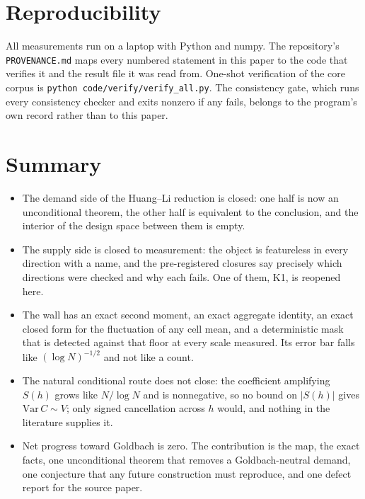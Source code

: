 \documentclass[11pt,a4paper]{article}
\theoremstyle{plain}
\theoremstyle{definition}
\begin{document}
\section{Reproducibility}

All measurements run on a laptop with Python and numpy. The
repository's \texttt{PROVENANCE.md} maps every numbered statement in
this paper to the code that verifies it and the result file it was
read from. One-shot verification of the core corpus is
\texttt{python code/verify/verify\_all.py}. The consistency gate, which
runs every consistency checker and exits nonzero if any fails, belongs
to the program's own record rather than to this paper.

\section{Summary}

\begin{itemize}
\item The demand side of the Huang--Li reduction is closed: one half
  is now an unconditional theorem, the other half is equivalent to the
  conclusion, and the interior of the design space between them is
  empty.
\item The supply side is closed to measurement: the object is
  featureless in every direction with a name, and the pre-registered
  closures say precisely which directions were checked and why each
  fails. One of them, K1, is reopened here.
\item The wall has an exact second moment, an exact aggregate identity,
  an exact closed form for the fluctuation of any cell mean, and a
  deterministic mask that is detected against that floor at every scale
  measured. Its error bar falls like $(\log N)^{-1/2}$ and not like a
  count.
\item The natural conditional route does not close: the coefficient
  amplifying $S(h)$ grows like $N/\log N$ and is nonnegative, so no
  bound on $|S(h)|$ gives $\mathrm{Var}\,C\sim V$; only signed
  cancellation across $h$ would, and nothing in the literature supplies
  it.
\item Net progress toward Goldbach is zero. The contribution is the
  map, the exact facts, one unconditional theorem that removes a
  Goldbach-neutral demand, one conjecture that any future construction
  must reproduce, and one defect report for the source paper.
\end{itemize}
\end{document}
